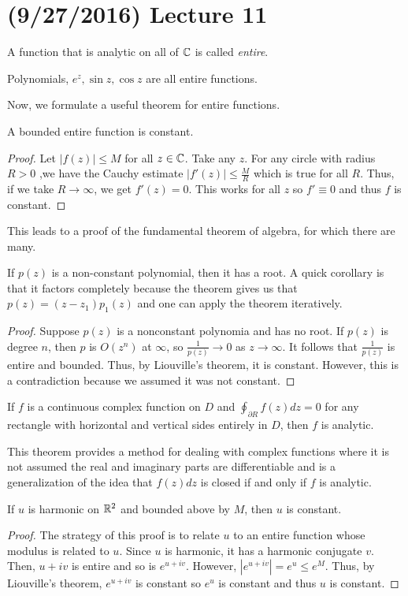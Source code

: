 \documentclass[11pt,leqno,oneside]{amsart}
\begin{document}
  \section{(9/27/2016) Lecture 11}
  \begin{defn}
    A function that is analytic on all of ${\mathbb C}$ is called \emph{entire}.
  \end{defn}
  \begin{example}
    Polynomials, $e^z, \sin z, \cos z$ are all entire functions.
  \end{example}
  Now, we formulate a useful theorem for entire functions.
  \begin{thm}
    A bounded entire function is constant. 
  \end{thm}
  \begin{proof}
    Let $|f(z)| \leq M$ for all $z \in {\mathbb C}$. Take any $z$. For any
    circle with radius $R >
    0$ ,we have the Cauchy estimate $|f'(z)| \leq \frac{M}{R}$ which
    is true for all $R$. Thus, if we take $R \to \infty$, we get
    $f'(z) = 0$. This works for all $z$ so $f' \equiv 0$ and thus $f$
    is constant. 
  \end{proof}
  This leads to a proof of the fundamental theorem of algebra, for
  which there are many.
  \begin{thm}
    If $p(z)$ is a non-constant polynomial, then it has a root. A
    quick corollary is that it factors completely because the theorem
    gives us that $p(z) = (z-z_1)p_1(z)$ and one can apply the theorem iteratively.
  \end{thm}
  \begin{proof}
    Suppose $p(z)$ is a nonconstant polynomia and has no root. If
    $p(z)$ is degree $n$, then $p$ is $O(z^n)$ at $\infty$, so
    $\frac{1}{p(z)} \to 0$ as $z \to \infty$. It follows that
    $\frac{1}{p(z)}$ is entire and bounded. Thus, by Liouville's
    theorem, it is constant. However, this is a contradiction because
    we assumed it was not constant.
  \end{proof}
  \begin{thm}
    If $f$ is a continuous complex function on $D$ and
    $\oint_{\partial R} f(z)dz = 0$ for any rectangle with horizontal
    and vertical sides entirely in $D$, then $f$ is analytic.
  \end{thm}
  This theorem provides a method for dealing with complex functions
  where it is not assumed the real and imaginary parts are
  differentiable and is a generalization of the idea that $f(z)dz$ is
  closed if and only if $f$ is analytic.
  \begin{thm}
    If $u$ is harmonic on ${\mathbb R}^2$ and bounded above by $M$, then $u$ is
    constant. 
  \end{thm}
  \begin{proof}
    The strategy of this proof is to relate $u$ to an entire function
    whose modulus is related to $u$. Since $u$ is harmonic, it has a
    harmonic conjugate $v$. Then, $u+iv$ is entire and so is
    $e^{u+iv}$. However, $|e^{u+iv}| = e^u \leq e^M$. Thus, by
    Liouville's theorem, $e^{u+iv}$ is constant so $e^u$ is constant
    and thus $u$ is constant.
  \end{proof}
\end{document}
